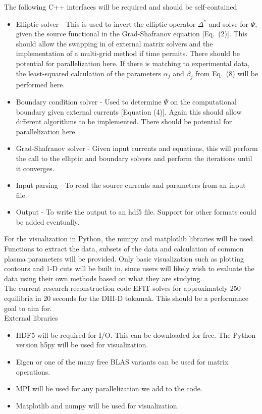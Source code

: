 \documentclass[paper=letter, fontsize=11pt]{scrartcl} %
\begin{document}
The following C++ interfaces will be required and should be self-contained
\begin{itemize}
\item Elliptic solver - This is used to invert the elliptic operator $\Delta^*$ and solve for $\Psi$, given the source functional in the Grad-Shafranov equation [Eq.~(2)]. This should allow the swapping in of external matrix solvers and the implementation of a multi-grid method if time permits. There should be potential for parallelization here. If there is matching to experimental data, the least-squared calculation of the parameters $\alpha_j$ and $\beta_j$ from Eq.~(8) will be performed here. 
\item Boundary condition solver - Used to determine $\Psi$ on the computational boundary given external currents [Equation (4)]. Again this should allow different algorithms to be implemented. There should be potential for parallelization here. 
\item Grad-Shafranov solver - Given input currents and equations, this will perform the call to the elliptic and boundary solvers and perform the iterations until it converges.
\item Input parsing - To read the source currents and parameters from an input file.
\item Output - To write the output to an hdf5 file. Support for other formats could be added eventually.
\end{itemize}

For the visualization in Python, the numpy and matplotlib libraries will be used. Functions to extract the data, subsets of the data and calculation of common plasma parameters will be provided. Only basic visualization such as plotting contours and 1-D cuts will be built in, since users will likely wish to evaluate the data using their own methods based on what they are studying. \\

The current research reconstruction code EFIT solves for approximately 250 equilibria in 20 seconds for the DIII-D tokamak. This should be a performance goal to aim for. \\

External libraries
\begin{itemize}
\item HDF5 will be required for I/O. This can be downloaded for free. The Python version h5py will be used for visualization.
\item Eigen or one of the many free BLAS variants can be used for matrix operations.
\item MPI will be used for any parallelization we add to the code. 
\item Matplotlib and numpy will be used for visualization.
\end{itemize}
\end{document}
